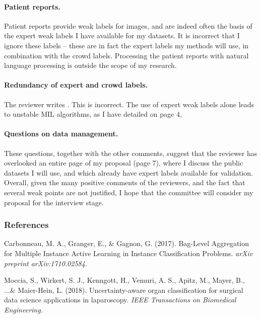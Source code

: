 \documentclass[serif, twocolumn, numeric, rga]{jote-article}
\begin{document}
\paragraph{Patient reports.} Patient reports provide weak labels for images, and are indeed often the basis of the expert weak labels I have available for my datasets. It is incorrect that I ignore these labels – these are in fact the expert labels my methods will use, in combination with the crowd labels. Processing the patient reports with natural language processing is outside the scope of my research.

\paragraph{Redundancy of expert and crowd labels.} The reviewer writes \textit{\color{red}{``if expert labels exist than crowd labels do not seem necessary''}}. This is incorrect. The use of expert weak labels alone leads to unstable MIL algorithms, as I have detailed on page 4, \textit{\color{jotedark}{``In practice this means that without strong annotations, MIL algorithms are poor at localizing abnormalities [13].''}}

\paragraph{Questions on data management.} These questions, together with the other comments, suggest that the reviewer has overlooked an entire page of my proposal (page 7), where I discuss the public datasets I will use, and which already have expert labels available for validation.
Overall, given the many positive comments of the reviewers, and the fact that several weak points are not justified, I hope that the committee will consider my proposal for the interview stage.


 {}\subsubsection*{References}
\hspace{8pt} Carbonneau, M. A., Granger, E., \& Gagnon, G. (2017). Bag-Level Aggregation for Multiple Instance Active Learning in Instance Classification Problems. \textit{arXiv preprint arXiv:1710.02584.} 

Moccia, S., Wirkert, S. J., Kenngott, H., Vemuri, A. S., Apitz, M., Mayer, B., ...\& Maier-Hein, L. (2018). Uncertainty-aware organ classification for surgical data science applications in laparoscopy. \textit{IEEE Transactions on Biomedical Engineering.}
\end{document}
